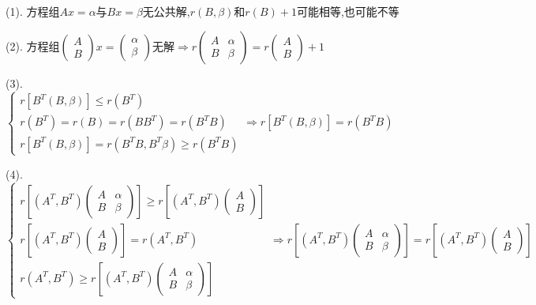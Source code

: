 \begin{solution}

	(1). 方程组$Ax=\alpha$与$Bx=\beta$无公共解,$r(B,\beta)$和$r(B)+1$可能相等,也可能不等
	
	(2). 方程组$\left( \begin{matrix}
		A\\B
	\end{matrix}\right)x=\left( \begin{matrix}
		\alpha\\\beta
	\end{matrix}\right)$无解$\Rightarrow r\left(\begin{matrix}
	A&\alpha\\B&\beta
\end{matrix}\right)=r\left( \begin{matrix}
A\\B
\end{matrix}\right) +1$

	(3). $\left\lbrace
	\begin{array}{l}
		r\left[B^{T}(B,\beta)\right]\leq r(B^{T})\\
		r(B^{T})=r(B)=r(BB^{T})=r(B^{T}B)\\
		r\left[B^{T}(B,\beta)\right]=r(B^{T}B,B^{T}\beta)\geq r(B^{T}B)
	\end{array}
	\right. \Rightarrow r\left[B^{T}(B,\beta)\right]=r(B^{T}B)$
	
	(4). $$\left\lbrace
	\begin{array}{l}
		r\left[(A^T,B^T)\left(\begin{matrix}
			A&\alpha\\B&\beta
		\end{matrix} \right) \right]\geq r\left[ (A^T,B^T)\left( \begin{matrix}
		A\\B
	\end{matrix}\right) \right] \\
		r\left[ (A^T,B^T)\left( \begin{matrix}
			A\\B
		\end{matrix}\right) \right] =r(A^{T},B^{T})\\
	r(A^{T},B^{T})\geq r\left[(A^T,B^T)\left(\begin{matrix}
		A&\alpha\\B&\beta
	\end{matrix} \right) \right]
	\end{array}
	\right. \Rightarrow r\left[(A^T,B^T)\left(\begin{matrix}
		A&\alpha\\B&\beta
	\end{matrix} \right) \right] =r\left[ (A^T,B^T)\left( \begin{matrix}
		A\\B
	\end{matrix}\right) \right] $$
\end{solution}

